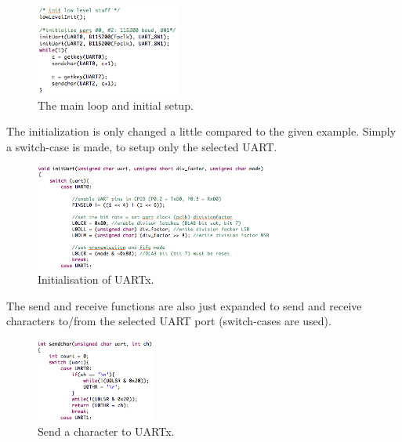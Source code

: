 \begin{figure}[h!]		%
 \begin{centering}
  \includegraphics[width=0.42\textwidth]{main.png}
   \caption{The main loop and initial setup.}
 \end{centering}
\end{figure}

\newpage
The initialization is only changed a little compared to the given example. Simply a switch-case is made, to setup only the selected UART. 

\begin{figure}[h!]		%
 \begin{centering}
  \includegraphics[width=0.7\textwidth]{inituart.png}
   \caption{Initialisation of UARTx.}
 \end{centering}
\end{figure}

The send and receive functions are also just expanded to send and receive characters to/from the selected UART port (switch-cases are used).

\begin{figure}[h!]		%
 \begin{centering}
  \includegraphics[width=0.35\textwidth]{senduart.png}
   \caption{Send a character to UARTx.}
 \end{centering}
\end{figure}

